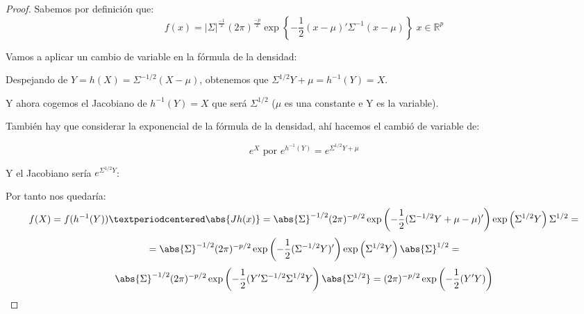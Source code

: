 \begin{proof}
Sabemos por definición que:
\[
f(x) = |Σ|^\frac{-1}{2}(2π)^{\frac{-p}{2}}\exp\left\{ -\frac{1}{2}(x-μ)'Σ^{-1}(x-μ) \right\}\; x∈ℝ^p
\]

Vamos a aplicar un cambio de variable en la fórmula de la densidad:

Despejando de $Y = h(X)= \Sigma^{-1/2}(X-\mu)$, obtenemos que $\Sigma^{1/2}Y+\mu=h^{-1}(Y)=X$.

Y ahora cogemos el Jacobiano de $h^{-1}(Y)=X$ que será $\Sigma^{1/2}$ ($\mu$ es una constante e Y es la variable).

También hay que considerar la exponencial de la fórmula de la densidad, ahí hacemos el cambió de variable de:

$$e^X \text{ por } e^{h^{-1}(Y)}=e^{\Sigma^{1/2}Y+\mu}$$

Y el Jacobiano sería $e^{\Sigma^{1/2}Y}$:


Por tanto nos quedaría:
\[
f(X) = f(h^{-1}(Y))·\abs{Jh(x)} = \abs{\Sigma}^{-1/2}(2 \pi)^{-p/2} \exp\left(-\frac{1}{2}(\Sigma^{-1/2}Y+\mu-\mu)'  \right) \exp\left( \Sigma^{1/2}Y \right) \Sigma^{1/2}  =
\]
\[
= \abs{\Sigma}^{-1/2}(2 \pi)^{-p/2} \exp\left(-\frac{1}{2}(\Sigma^{-1/2}Y)' \right) \exp\left( \Sigma^{1/2}Y \right) \abs{\Sigma}^{1/2} =
\]
\[
\abs{\Sigma}^{-1/2}(2 \pi)^{-p/2} \exp\left(-\frac{1}{2}(Y'\Sigma^{-1/2}\Sigma^{1/2}Y \right) \abs{\Sigma^{1/2}} = (2 \pi)^{-p/2} \exp\left(-\frac{1}{2}(Y'Y) \right)
\]
\end{proof}



